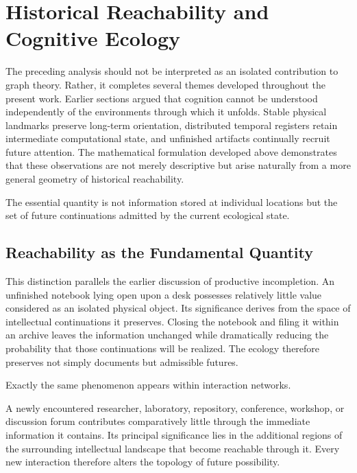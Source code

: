 \documentclass[12pt,oneside]{article}
\theoremstyle{remark}
\begin{document}

\section{Historical Reachability and Cognitive Ecology}

The preceding analysis should not be interpreted as an isolated contribution to graph theory. Rather, it completes several themes developed throughout the present work. Earlier sections argued that cognition cannot be understood independently of the environments through which it unfolds. Stable physical landmarks preserve long-term orientation, distributed temporal registers retain intermediate computational state, and unfinished artifacts continually recruit future attention. The mathematical formulation developed above demonstrates that these observations are not merely descriptive but arise naturally from a more general geometry of historical reachability.

The essential quantity is not information stored at individual locations but the set of future continuations admitted by the current ecological state.

\subsection{Reachability as the Fundamental Quantity}

This distinction parallels the earlier discussion of productive incompletion. An unfinished notebook lying open upon a desk possesses relatively little value considered as an isolated physical object. Its significance derives from the space of intellectual continuations it preserves. Closing the notebook and filing it within an archive leaves the information unchanged while dramatically reducing the probability that those continuations will be realized. The ecology therefore preserves not simply documents but admissible futures.

Exactly the same phenomenon appears within interaction networks.

A newly encountered researcher, laboratory, repository, conference, workshop, or discussion forum contributes comparatively little through the immediate information it contains. Its principal significance lies in the additional regions of the surrounding intellectual landscape that become reachable through it. Every new interaction therefore alters the topology of future possibility.
\end{document}
